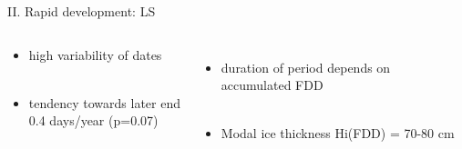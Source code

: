 \documentclass[8pt]{beamer}
\begin{document}
\begin{frame}[fragile]{II. Rapid development: LS}
	\begin{columns}
		\begin{center}
			\begin{itemize}
				\item{high variability of dates}\\~\\
				\item{tendency towards later end \\ 0.4 days/year (p=0.07)\\}
			\end{itemize}
		\end{center}
		\begin{itemize}
			\item{duration of period depends on\\ accumulated FDD}\\~\\
			\item{Modal ice thickness Hi(FDD) = 70-80 cm}
		\end{itemize}
	\end{columns}
\end{frame}
\end{document}
